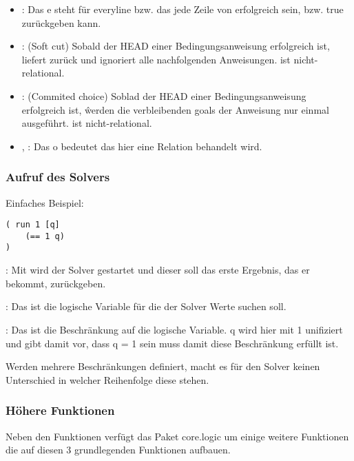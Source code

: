 \begin{itemize}
\item {}:
Das e steht für \dq{}everyline\dq{} bzw. das jede Zeile von  erfolgreich sein, bzw. true zurückgeben kann.

\item {}:
(Soft cut) Sobald der \dq{}HEAD\dq{} einer Bedingungsanweisung erfolgreich ist, liefert   zurück und ignoriert alle nachfolgenden Anweisungen.  ist nicht-relational.

\item {}:
(Commited choice) Soblad der \dq{}HEAD\dq{} einer Bedingungsanweisung erfolgreich ist, ŵerden die verbleibenden \dq{}goals\dq{} der Anweisung nur einmal ausgeführt.  ist nicht-relational.

\item {}, :
Das \dq{}o\dq{} bedeutet das hier eine Relation behandelt wird.
\end{itemize}


\subsubsection{Aufruf des Solvers}

Einfaches Beispiel:

\begin{lstlisting}
( run 1 [q] 
	(== 1 q)
)
\end{lstlisting}
\begin{description}
\item{:}
Mit  wird der Solver gestartet und dieser soll das erste Ergebnis, das er bekommt, zurückgeben.
\item{\code{[q]}:}
Das ist die logische Variable für die der Solver Werte suchen soll.
\item{:}
Das ist die Beschränkung auf die logische Variable. q wird hier mit 1 unifiziert und gibt damit vor, dass q = 1 sein muss damit diese Beschränkung erfüllt ist.
\end{description}
Werden mehrere Beschränkungen definiert, macht es für den Solver keinen Unterschied in welcher Reihenfolge diese stehen. 

\subsubsection{Höhere Funktionen}

Neben den Funktionen  verfügt das Paket core.logic um einige weitere Funktionen die auf diesen 3 grundlegenden Funktionen aufbauen.

